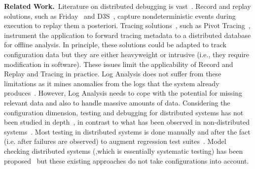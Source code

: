 \documentclass[11pt]{article}
\newcommand{\ie}{i.e.}
\newcommand{\Comment}[1]{}
\begin{document}
\vspace{1ex} \textbf{Related Work.}~Literature on distributed
debugging is vast~\cite{BeschastnikhWBE2016}. Record and replay
solutions, such as Friday~\cite{geels-usenix2007} and
D3S~\cite{d3s-debugging-deployed-distributed-systems}, capture
nondeterministic events during execution to replay them a posteriori.
Tracing solutions~\cite{sambasian-etal-techreport2014}, such as Pivot
Tracing~\cite{mace-etal-usenix2016}, instrument the application to
forward tracing metadata to a distributed database for offline
analysis. In principle, these solutions could be adapted to track
configuration data but they are either heavyweight or intrusive
(\ie{}, they require modification in software).  These issues limit
the applicability of Record and Replay and Tracing in practice. Log
Analysis does not suffer from these limitations as it mines anomalies
from the logs that the system already produces~\cite{xu-etal-slam10}.
However, Log Analysis needs to cope with the potential for missing
relevant data and also to handle massive amounts of data.
Considering the configuration dimension, testing and debugging for
distributed systems has not been studied in
depth~\cite{matt-welsh-blog}, in contrast to what has been observed in
non-distributed
systems~\cite{yin-etal-sosp2011,zhang-ernst-icse2013,zhang-ernst-icse2014,behrang-etal-fse2015,weiss-etal-ase2017}.
Most testing in distributed systems is done manually and after the
fact (\ie{} after failures are observed) to augment regression test
suites~\cite{beschastnikh-etal-icse2014}. Model checking distributed
systems (,which is essentially systematic testing) has been
proposed~\cite{killian-etal-nsdi07,yang-etal-nsdi09} but these
existing approaches do not take configurations into account.



\end{document}
